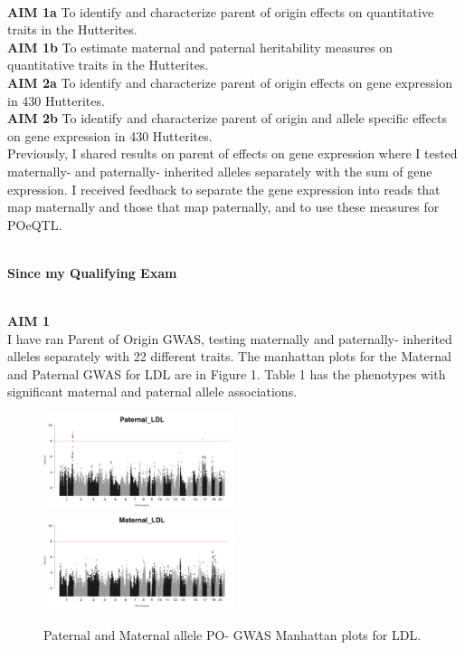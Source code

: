 \documentclass[a4paper, 11pt]{article}
\begin{document}
\textbf{\\AIM 1a} To identify and characterize parent of origin effects on quantitative traits in the Hutterites. 
   \textbf{\\AIM 1b} To estimate maternal and paternal heritability measures on quantitative traits in the Hutterites.
\textbf{\\AIM 2a} To identify and characterize parent of origin effects on gene expression in 430 Hutterites.\\
\textbf{AIM 2b} To identify and characterize parent of origin and allele specific effects on gene expression in 430 Hutterites.\\



Previously, I shared results on parent of effects on gene expression where I tested maternally- and paternally- inherited alleles separately with the sum of gene expression.\cite{Cusanovich} I received feedback to separate the gene expression into reads that map maternally and those that map paternally, and to use these measures for POeQTL.

\textbf{\\Since my Qualifying Exam}

\textbf{\\AIM 1}\\
I have ran Parent of Origin GWAS, testing maternally and paternally- inherited alleles separately with 22 different traits. The manhattan plots for the Maternal and Paternal GWAS for LDL are in Figure 1. Table 1 has the phenotypes with significant maternal and paternal allele associations. \\

\begin{figure}[!h]
\includegraphics[width=0.5\textwidth]{Manhattan_paternal_LDL_8_17_16.png}
\includegraphics[width=0.5\textwidth]{Manhattan_maternal_LDL_8_17_16.png}
\caption{\label{fig:POGWAS}Paternal and Maternal allele PO- GWAS Manhattan plots for LDL.}
\end{figure}
\end{document}
